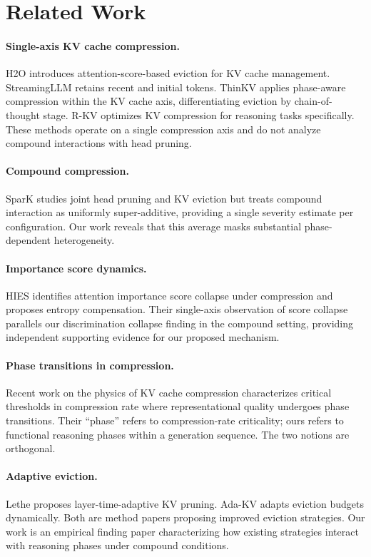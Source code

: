 \documentclass[11pt,a4paper]{article}
\begin{document}
\section{Related Work}

\paragraph{Single-axis KV cache compression.}
H2O \citep{zhang2023h2o} introduces attention-score-based eviction for KV cache management. StreamingLLM \citep{xiao2023streamingllm} retains recent and initial tokens. ThinKV applies phase-aware compression within the KV cache axis, differentiating eviction by chain-of-thought stage. R-KV optimizes KV compression for reasoning tasks specifically. These methods operate on a single compression axis and do not analyze compound interactions with head pruning.

\paragraph{Compound compression.}
SparK studies joint head pruning and KV eviction but treats compound interaction as uniformly super-additive, providing a single severity estimate per configuration. Our work reveals that this average masks substantial phase-dependent heterogeneity.

\paragraph{Importance score dynamics.}
HIES identifies attention importance score collapse under compression and proposes entropy compensation. Their single-axis observation of score collapse parallels our discrimination collapse finding in the compound setting, providing independent supporting evidence for our proposed mechanism.

\paragraph{Phase transitions in compression.}
Recent work on the physics of KV cache compression characterizes critical thresholds in compression rate where representational quality undergoes phase transitions. Their ``phase'' refers to compression-rate criticality; ours refers to functional reasoning phases within a generation sequence. The two notions are orthogonal.

\paragraph{Adaptive eviction.}
Lethe proposes layer-time-adaptive KV pruning. Ada-KV adapts eviction budgets dynamically. Both are method papers proposing improved eviction strategies. Our work is an empirical finding paper characterizing how existing strategies interact with reasoning phases under compound conditions.
\end{document}
